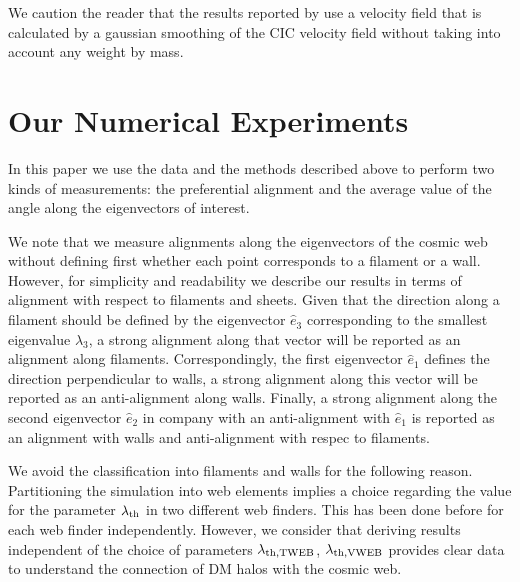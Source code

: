 \documentclass[useAMS,usenatbib]{mn2e}
\newcommand{\hMsun}{{\ifmmode{h^{-1}{\rm
        {M_{\odot}}}}\else{$h^{-1}{\rm{M_{\odot}}}$~}\fi}}
\begin{document}
We caution the reader that the results reported by
\citep{Vweb, Libeskind2013,Wang2013} use a velocity field that is
calculated by a gaussian smoothing of the CIC velocity field without
taking into account any weight by mass.   






\section{Our Numerical Experiments}
\label{sec:experiments}

In this paper we use the data and the methods described above to
perform two kinds of measurements: the preferential alignment and the
average value of the angle along the eigenvectors of interest.

We note that we measure alignments along the eigenvectors of the
cosmic web without defining first whether each point corresponds to a
filament or a wall. However, for simplicity and readability we describe
our results in terms of alignment with respect to filaments and
sheets. Given that the direction along a filament should be defined by the
eigenvector $\hat{e}_3$ corresponding to the smallest eigenvalue $\lambda_3$, a
strong alignment along that vector will be reported as an alignment
along filaments. Correspondingly, the first eigenvector $\hat{e}_{1}$
defines the direction perpendicular to walls, a strong alignment along
this vector will be reported as an anti-alignment along
walls. Finally, a strong alignment along the second eigenvector
$\hat{e}_2$ in company with an anti-alignment with $\hat{e}_1$ is
reported as an alignment with walls and anti-alignment with respec to
filaments. 


We avoid the classification into filaments and walls for the following
reason. Partitioning the simulation into web elements implies
a choice regarding the value for the parameter $\lambda_{\rm th}$ in
two different web finders. This has been done before for each web
finder independently. However, we consider that deriving results
independent of the choice of parameters $\lambda_{\rm th,TWEB}$,
$\lambda_{\rm th, VWEB}$ provides clear data to understand the
connection of DM halos with the cosmic web.  
\end{document}
